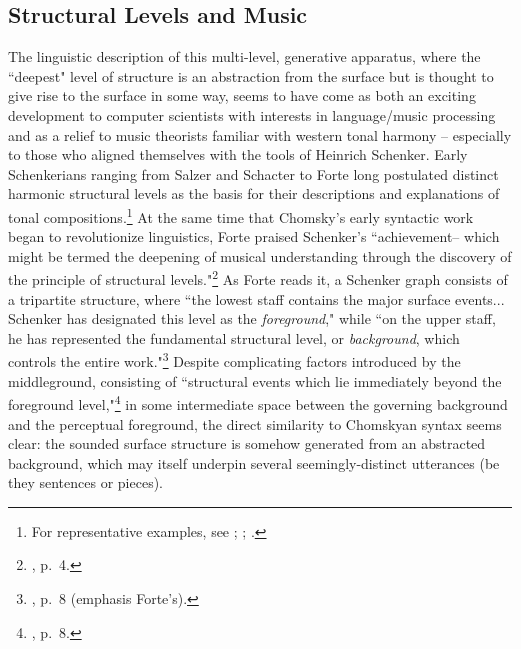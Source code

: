 \subsection{Structural Levels and Music}
The linguistic description of this multi-level, generative apparatus, where the ``deepest" level of structure is an abstraction from the surface but is thought to give rise to the surface in some way, seems to have come as both an exciting development to computer scientists with interests in language/music processing and as a relief to music theorists familiar with western tonal harmony -- especially to those who aligned themselves with the tools of Heinrich Schenker.  Early Schenkerians ranging from Salzer and Schacter to Forte long postulated distinct harmonic structural levels as the basis for their descriptions and explanations of tonal compositions.\footnote{For representative examples, see \cite{salzer1969}; \cite{forte1959}; \cite{forte1982}.}   At the same time that Chomsky's early syntactic work began to revolutionize linguistics, Forte praised Schenker's ``achievement-- which might be termed the deepening of musical understanding through the discovery of the principle of structural levels."\footnote{\cite{forte1959}, p.\ 4.}  As Forte reads it, a Schenker graph consists of a tripartite structure, where ``the lowest staff contains the major surface events... Schenker has designated this level as the \emph{foreground}," while ``on the upper staff, he has represented the fundamental structural level, or \emph{background}, which controls the entire work."\footnote{\cite{forte1959}, p.\ 8 (emphasis Forte's).}  Despite complicating factors introduced by the middleground, consisting of ``structural events which lie immediately beyond the foreground level,"\footnote{\cite{forte1959}, p.\ 8.} in some intermediate space between the governing background and the perceptual foreground, the direct similarity to Chomskyan syntax seems clear: the sounded surface structure is somehow generated from an abstracted background, which may itself underpin several seemingly-distinct utterances (be they sentences or pieces).

